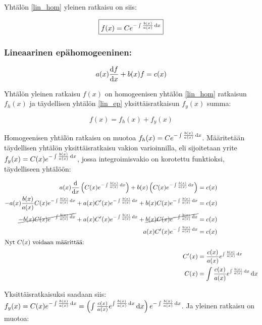 \documentclass[../johdoksia.tex]{subfiles}
\begin{document}
	Yhtälön \ref{lin_hom} yleinen ratkaisu on siis:
	
	\begin{equation}
		\boxed{f(x) = Ce^{-\int\frac{b(x)}{a(x)}\odif{x}}}
	\end{equation}
	
	\subsubsection{Lineaarinen epähomogeeninen:}
	
	\begin{equation}
		\label{lin_ep}
		a(x)\odv{f}{x} + b(x)f = c(x)
	\end{equation}
	
	Yhtälön yleinen ratkaisu $f(x)$ on homogeenisen yhtälön \ref{lin_hom} ratkaisun $f_h(x)$ ja täydellisen yhtälön \ref{lin_ep} yksittäisratkaisun $f_y(x)$ summa:
	
	\begin{equation*}
		f(x) = f_{h}(x) + f_{y}(x)
	\end{equation*}
	
	Homogeenisen yhtälön ratkaisu on muotoa $f_h(x) = Ce^{-\int\frac{b(x)}{a(x)}\odif{x}}$. Määritetään täydellisen yhtälön yksittäisratkaisu vakion varioinnilla, eli sijoitetaan yrite $f_y(x) = C(x)e^{-\int\frac{b(x)}{a(x)}\odif{x}}$, jossa integroimisvakio on korotettu funktioksi, täydelliseen yhtälöön:
	
	\begin{align*}
		a(x)\odv{}{x}\left(C(x)e^{-\int\frac{b(x)}{a(x)}\odif{x}}\right) + b(x)\left(C(x)e^{-\int\frac{b(x)}{a(x)}\odif{x}}\right) &= c(x) \\
		-a(x)\frac{b(x)}{a(x)}C(x)e^{-\int\frac{b(x)}{a(x)}\odif{x}} + a(x)C'(x)e^{-\int\frac{b(x)}{a(x)}\odif{x}} + b(x)C(x)e^{-\int\frac{b(x)}{a(x)}\odif{x}} &= c(x) \\
		\cancel{-b(x)C(x)e^{-\int\frac{b(x)}{a(x)}\odif{x}}} + a(x)C'(x)e^{-\int\frac{b(x)}{a(x)}\odif{x}} + \cancel{b(x)C(x)e^{-\int\frac{b(x)}{a(x)}\odif{x}}} &= c(x) \\
		a(x)C'(x)e^{-\int\frac{b(x)}{a(x)}\odif{x}} &= c(x) \\
		\intertext{Nyt $C(x)$ voidaan määrittää:}
		C'(x) &= \frac{c(x)}{a(x)}e^{\int\frac{b(x)}{a(x)}\odif{x}} \\
		C(x) &= \int \frac{c(x)}{a(x)}e^{\int\frac{b(x)}{a(x)}\odif{x}}\odif{x}
	\end{align*}
	
	Yksittäisratkaisuksi saadaan siis: $f_y(x) = C(x)e^{-\int\frac{b(x)}{a(x)}\odif{x}} = \left(\int \frac{c(x)}{a(x)}e^{\int\frac{b(x)}{a(x)}\odif{x}}\odif{x}\right)e^{-\int\frac{b(x)}{a(x)}\odif{x}}$. Ja yleinen ratkaisu on muotoa:
	
\end{document}
